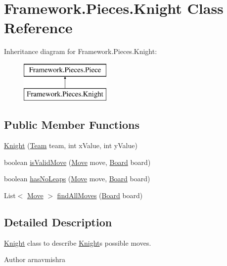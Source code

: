 \hypertarget{class_framework_1_1_pieces_1_1_knight}{}\section{Framework.\+Pieces.\+Knight Class Reference}
\label{class_framework_1_1_pieces_1_1_knight}
Inheritance diagram for Framework.\+Pieces.\+Knight\+:\begin{figure}[H]
\begin{center}
\leavevmode
\includegraphics[height=2.000000cm]{class_framework_1_1_pieces_1_1_knight}
\end{center}
\end{figure}
\subsection*{Public Member Functions}
\begin{DoxyCompactItemize}
\item 
\hyperlink{class_framework_1_1_pieces_1_1_knight_ac232462b30d8b736259c7f552436468b}{Knight} (\hyperlink{class_framework_1_1_team}{Team} team, int x\+Value, int y\+Value)
\item 
boolean \hyperlink{class_framework_1_1_pieces_1_1_knight_ae483ea0bcaf3af8a6450532497165eb4}{is\+Valid\+Move} (\hyperlink{class_framework_1_1_move}{Move} move, \hyperlink{class_framework_1_1_board}{Board} board)
\item 
boolean \hyperlink{class_framework_1_1_pieces_1_1_knight_a7dd994749014c4f3f3d5f48c4701fd1b}{has\+No\+Leaps} (\hyperlink{class_framework_1_1_move}{Move} move, \hyperlink{class_framework_1_1_board}{Board} board)
\item 
List$<$ \hyperlink{class_framework_1_1_move}{Move} $>$ \hyperlink{class_framework_1_1_pieces_1_1_knight_a0c01ddd9a78ca639d5ee87dc28ef5584}{find\+All\+Moves} (\hyperlink{class_framework_1_1_board}{Board} board)
\end{DoxyCompactItemize}


\subsection{Detailed Description}
\hyperlink{class_framework_1_1_pieces_1_1_knight}{Knight} class to describe \hyperlink{class_framework_1_1_pieces_1_1_knight}{Knight}\textquotesingle{}s possible moves. \begin{DoxyAuthor}{Author}
arnavmishra 
\end{DoxyAuthor}


